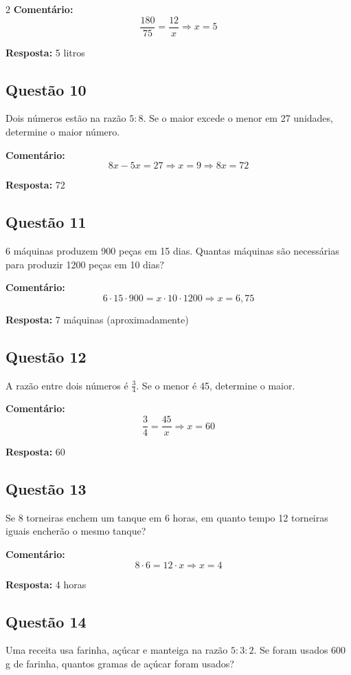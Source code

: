 \documentclass[11pt]{article}
\begin{document}
\begin{multicols}{2}
\textbf{Comentário:}
\[
\frac{180}{75} = \frac{12}{x}
\Rightarrow x = 5
\]

\textbf{Resposta:} 5 litros

\subsection*{Questão 10}
Dois números estão na razão $5:8$. Se o maior excede o menor em 27 unidades, determine o maior número.

\textbf{Comentário:}
\[
8x - 5x = 27 \Rightarrow x = 9
\Rightarrow 8x = 72
\]

\textbf{Resposta:} 72

\subsection*{Questão 11}
6 máquinas produzem 900 peças em 15 dias. Quantas máquinas são necessárias para produzir 1200 peças em 10 dias?

\textbf{Comentário:}
\[
6 \cdot 15 \cdot 900 = x \cdot 10 \cdot 1200
\Rightarrow x = 6{,}75
\]

\textbf{Resposta:} 7 máquinas (aproximadamente)

\subsection*{Questão 12}
A razão entre dois números é $\frac{3}{4}$. Se o menor é 45, determine o maior.

\textbf{Comentário:}
\[
\frac{3}{4} = \frac{45}{x}
\Rightarrow x = 60
\]

\textbf{Resposta:} 60

\subsection*{Questão 13}
Se 8 torneiras enchem um tanque em 6 horas, em quanto tempo 12 torneiras iguais encherão o mesmo tanque?

\textbf{Comentário:}
\[
8 \cdot 6 = 12 \cdot x
\Rightarrow x = 4
\]

\textbf{Resposta:} 4 horas

\subsection*{Questão 14}
Uma receita usa farinha, açúcar e manteiga na razão $5:3:2$. Se foram usados 600 g de farinha, quantos gramas de açúcar foram usados?


\end{multicols}
\end{document}
